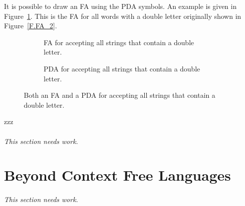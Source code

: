 \documentclass[letterpaper,12pt,openany,reqno]{book}%
\newcommand{\needswork}{\paragraph{This section needs work.}}
\newcommand{\fanonterminalnode}[2] {\node at (#1) (#2) [circle, draw, minimum size=24pt] {#2};}
\newcommand{\fatransition}[3] {\draw [->] (#1) -- (#2) node [midway, above] {#3};}
\newcommand{\faarctransition}[5] {\draw [->] (#1) to[out=#4, in=#5] node  [midway, above] {#3} (#2) ;}
\newcommand{\faloopright}[2] {\draw (#1) edge [loop right] node {#2} ();}
\newcommand{\pdaterminal}[3] {\node at (#1) (#2) [rectangle, draw, rounded corners] {#3};}
\newcommand{\pdaread}[3] {\node at (#1) (#2) [diamond, draw] {#3}; }
\newcommand{\pdatransition}[3] {\draw [->] (#1) -- (#2) node [midway, above] {#3};}
\newcommand{\pdarighttransition}[3] {\draw [->] (#1) -- (#2) node [midway, right] {#3};}
\newcommand{\pdaarctransition}[5] {\draw [->] (#1) to[out=#4, in=#5] node  [midway, above] {#3} (#2) ;}
\newcommand{\pdaloopright}[2] {\draw (#1) edge [loop right] node {#2} ();}
\begin{document}
It is possible to draw an FA using the PDA symbols. An example is given in Figure~\ref{F.PDA.1}. This is the FA for all words with a double letter originally shown in Figure~\ref{F.FA_2}.

\begin{figure}[hbt]
\centering
\begin{subfigure}[b]{0.45\textwidth}
\centering
{}
 \caption{FA for accepting all strings that contain a double letter.}
\end{subfigure}

\begin{subfigure}[b]{0.45\textwidth}
\centering
{}
 \caption{PDA for accepting all strings that contain a double letter.}
\end{subfigure}

\caption{Both an FA and a PDA for accepting all strings that contain a double letter.}
\label{F.PDA.1}
\end{figure}


zzz

\needswork{}

\part{Beyond Context Free Languages}
\label{C.Beyond.Context.Free}
\needswork{}
\end{document}

